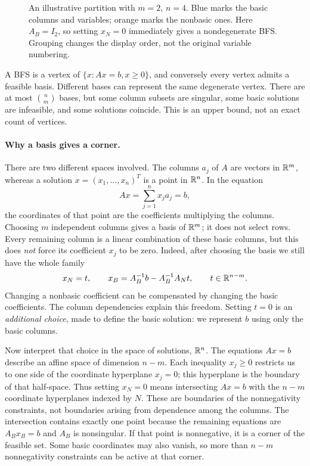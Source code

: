 \documentclass[11pt,a4paper]{article}
\begin{document}
\begin{figure}[H]
  \caption{An illustrative partition with $m=2$, $n=4$. Blue marks the basic
    columns and variables; orange marks the nonbasic ones. Here $A_B=I_2$,
    so setting $x_N=0$ immediately gives a nondegenerate BFS.
    Grouping changes the display order, not the original variable numbering.}
  \label{fig:partition}
\end{figure}
A BFS is a vertex of $\{x:Ax=b,x\geq0\}$, and conversely every vertex admits a
feasible basis. Different bases can represent the same degenerate vertex.
There are at most $\binom{n}{m}$ bases, but some column subsets are singular,
some basic solutions are infeasible, and some solutions coincide. This is an
upper bound, not an exact count of vertices.

\paragraph{Why a basis gives a corner.}
There are two different spaces involved. The columns $a_j$ of $A$ are
vectors in $\mathbb{R}^m$, whereas a solution $x=(x_1,\ldots,x_n)^T$ is a point
in $\mathbb{R}^n$. In the equation
\[
  Ax=\sum_{j=1}^n x_j a_j=b,
\]
the coordinates of that point are the coefficients multiplying the columns.
Choosing $m$ independent columns gives a basis of $\mathbb{R}^m$; it does not
select rows. Every remaining column is a linear combination of these
basic columns, but this does \emph{not} force its coefficient $x_j$ to be zero.
Indeed, after choosing the basis we still have the whole family
\[
  x_N=t,\qquad x_B=A_B^{-1}b-A_B^{-1}A_Nt,
  \qquad t\in\mathbb{R}^{n-m}.
\]
Changing a nonbasic coefficient can be compensated by changing the basic
coefficients. The column dependencies explain this freedom.
Setting $t=0$ is an \emph{additional choice}, made to define the basic
solution: we represent $b$ using only the basic columns.

Now interpret that choice in the space of solutions, $\mathbb{R}^n$.
The equations $Ax=b$ describe an affine space of dimension $n-m$.
Each inequality $x_j\geq0$ restricts us to one side of the coordinate
hyperplane $x_j=0$; this hyperplane is the boundary of that half-space.
Thus setting $x_N=0$ means intersecting $Ax=b$ with the $n-m$ coordinate
hyperplanes indexed by $N$. These are boundaries of the nonnegativity
constraints, not boundaries arising from dependence among the columns.
The intersection contains exactly one point because the remaining equations
are $A_Bx_B=b$ and $A_B$ is nonsingular. If that point is nonnegative,
it is a corner of the feasible set. Some basic coordinates may also vanish,
so more than $n-m$ nonnegativity constraints can be active at that corner.
\end{document}
